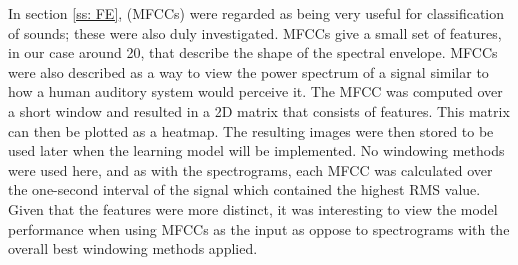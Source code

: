 \documentclass[class=report,11pt,crop=false]{standalone}
\begin{document}
In section \ref{ss: FE}, (MFCCs) were regarded as being very useful for classification of sounds; these were also duly investigated. MFCCs give a small set of features, in our case around 20, that describe the shape of the spectral envelope. MFCCs were also described as a way to view the power spectrum of a signal similar to how a human auditory system would perceive it. The MFCC was computed over a short window and resulted in a 2D matrix that consists of features. This matrix can then be plotted as a heatmap. The resulting images were then stored to be used later when the learning model will be implemented. No windowing methods were used here, and as with the spectrograms, each MFCC was calculated over the one-second interval of the signal which contained the highest RMS value. Given that the features were more distinct, it was interesting to view the model performance when using MFCCs as the input as oppose to spectrograms with the overall best windowing methods applied. 


\ifstandalone

\printnoidxglossary[type=\acronymtype,nonumberlist]
\fi
\end{document}
